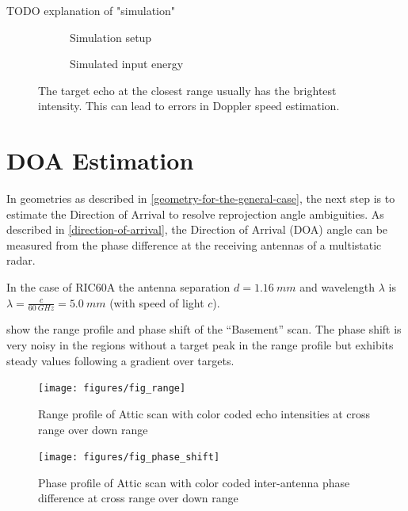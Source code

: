 TODO explanation of "simulation"

\begin{figure}[htbp]
    \centering
    \begin{subfigure}[t]{.5\textwidth}
        \centering
        \def\svgscale{.8}
        
        \caption{Simulation setup}
        \label{fig:squiggly_doppler_at_wall_1}
    \end{subfigure}%
    \hfill%
    \begin{subfigure}[t]{.5\textwidth}
        \centering
        \def\svgscale{.8}
        
        \caption{Simulated input energy}
        \label{fig:squiggly_doppler_at_wall_2}
    \end{subfigure}\bigskip
    \caption{The target echo at the closest range usually has the brightest intensity. This can lead to errors in Doppler speed estimation.}
    \label{fig:squiggly_doppler_at_wall}
\end{figure}

\section{DOA Estimation}\label{doa-implementation}

In geometries as described in \cref{geometry-for-the-general-case}, the next step is to estimate the Direction of Arrival to resolve reprojection angle ambiguities.
As described in \cref{direction-of-arrival}, the Direction of Arrival (DOA) angle can be measured from the phase difference at the receiving antennas of a multistatic radar.

In the case of RIC60A the antenna separation \(d=\SI{1.16}{mm}\) and
wavelength \(\lambda\) is \(\lambda=\frac{c}{\SI{60}{GHz}}=\SI{5.0}{mm}\) (with speed
of light \(c\)).

 show the range profile and phase shift of the
``Basement'' scan. The phase shift is very noisy in the regions without
a target peak in the range profile but exhibits steady values following
a gradient over targets.

\begin{figure}[htbp]
    \centering
    \texttt{[image: figures/fig\_range]}
    \caption{Range profile of Attic scan with color coded echo intensities at cross range over down range}
    \label{fig:fig_range}
\end{figure}

\begin{figure}[htbp]
    \centering
    \texttt{[image: figures/fig\_phase\_shift]}
    \caption{Phase profile of Attic scan with color coded inter-antenna phase difference at cross range over down range}
    \label{fig:fig_phase_shift}
\end{figure}

